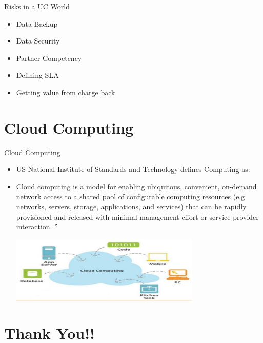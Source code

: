 \documentclass{SKP-beamer}
\begin{document}

\begin{frame}{ Risks in a UC World}
	\begin{itemize}
		
		\item  Data Backup
		\item Data Security
		\item Partner Competency
		\item Defining SLA
		\item Getting value from charge back
		
	\end{itemize}
\end{frame}


\section{\textbf{Cloud Computing}}

\begin{frame}{Cloud Computing}
	\begin{itemize}
		\item US National Institute of Standards and Technology defines Computing as:
		\item Cloud computing is a model for enabling ubiquitous, convenient, on-demand network access to a shared pool of 
		configurable computing resources (e.g networks, servers, storage, applications, and services) that can be 
		rapidly provisioned and released with minimal management effort or service provider interaction. ”
		
		\includegraphics[scale=1.5]{11.png}
		
	\end{itemize}
\end{frame}

\section{\textbf{Thank You!!}}

\begin{frame}
	\titlepage
\end{frame}
\end{document}
